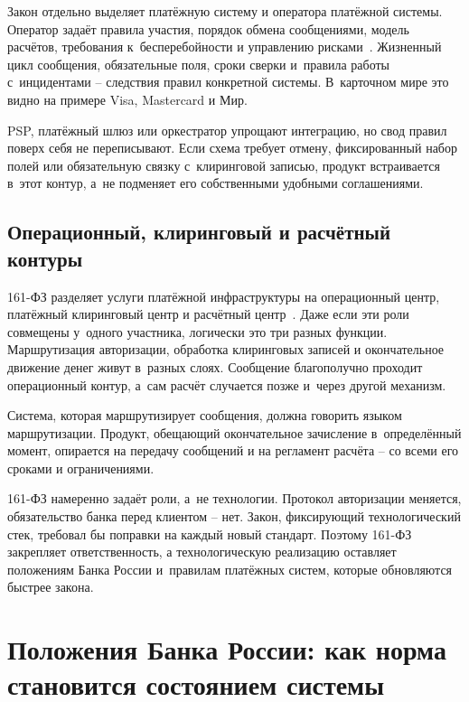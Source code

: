 Закон отдельно выделяет платёжную систему и оператора платёжной системы. Оператор задаёт правила участия, порядок обмена сообщениями, модель расчётов, требования к~бесперебойности и управлению рисками~\cite{fz-161}.
Жизненный цикл сообщения, обязательные поля, сроки сверки и~правила работы с~инцидентами -- следствия правил конкретной системы. В~карточном мире это видно на примере Visa, Mastercard и Мир.

PSP, платёжный шлюз или оркестратор упрощают интеграцию, но свод правил поверх себя не переписывают. Если схема требует отмену, фиксированный набор полей или обязательную связку с~клиринговой записью, продукт встраивается в~этот контур, а~не подменяет его собственными удобными соглашениями.

\subsection*{Операционный, клиринговый и расчётный контуры}

161-ФЗ разделяет услуги платёжной инфраструктуры на операционный центр, платёжный клиринговый центр и расчётный центр~\cite{fz-161}.
Даже если эти роли совмещены у~одного участника, логически это три разных функции. Маршрутизация авторизации, обработка клиринговых записей и окончательное движение денег живут в~разных слоях. Сообщение благополучно проходит операционный контур, а~сам расчёт случается позже и~через другой механизм.

Система, которая маршрутизирует сообщения, должна говорить языком маршрутизации. Продукт, обещающий окончательное зачисление в~определённый момент, опирается на передачу сообщений и на регламент расчёта -- со всеми его сроками и ограничениями.


161-ФЗ намеренно задаёт роли, а~не технологии. Протокол авторизации меняется, обязательство банка перед клиентом -- нет.
Закон, фиксирующий технологический стек, требовал бы поправки на каждый новый стандарт. Поэтому 161-ФЗ закрепляет ответственность, а технологическую реализацию оставляет положениям Банка России и~правилам платёжных систем, которые обновляются быстрее закона.

\section{Положения Банка России: как норма становится состоянием системы}\label{sec:regulation-cbr-provisions}

